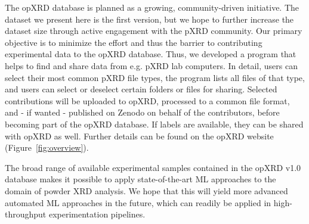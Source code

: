 The opXRD database is planned as a growing, community-driven initiative. The dataset we present here is the first version, but we hope to further increase the dataset size through active engagement with the pXRD community. Our primary objective is to minimize the effort and thus the barrier to contributing experimental data to the opXRD database. Thus, we developed a program that helps to find and share data from e.g. pXRD lab computers. In detail, users can select their most common pXRD file types, the program lists all files of that type, and users can select or deselect certain folders or files for sharing. Selected contributions will be uploaded to opXRD, processed to a common file format, and - if wanted - published on Zenodo on behalf of the contributors, before becoming part of the opXRD database. If labels are available, they can be shared with opXRD as well. Further details can be found on the opXRD website (Figure~\ref{fig:overview}).

The broad range of available experimental samples contained in the opXRD v1.0 database makes it possible to apply state-of-the-art ML approaches to the domain of powder XRD analysis.
We hope that this will yield more advanced automated ML approaches in the future, which can readily be applied in high-throughput experimentation pipelines.








